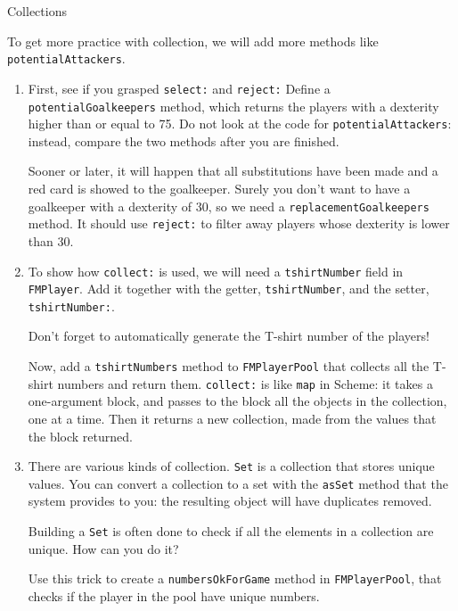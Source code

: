 \documentclass[a4paper,10pt]{scrartcl}
\begin{document}
\begin{exercise}{Collections}

To get more practice with collection, we will add more methods like
\verb!potentialAttackers!.

\begin{enumerate}
\item First, see if you grasped \verb!select:! and \verb!reject:!  Define
  a \verb!potentialGoalkeepers! method, which returns the players with a
  dexterity higher than or equal to 75.  Do not look at the code for
  \verb!potentialAttackers!: instead, compare the two methods after you are
  finished.

  Sooner or later, it will happen that all substitutions have been made and
  a red card is showed to the goalkeeper.  Surely you don't want to have a
  goalkeeper with a dexterity of 30, so we need a \verb!replacementGoalkeepers!
  method.  It should use \verb!reject:! to filter away players whose dexterity
  is lower than 30.

\item To show how \verb!collect:! is used, we will need a \verb!tshirtNumber!
  field in \verb!FMPlayer!.  Add it together with the getter,
  \verb!tshirtNumber!, and the setter, \verb!tshirtNumber:!.

  Don't forget to automatically generate the T-shirt number of the players!

  Now, add a \verb!tshirtNumbers! method to \verb!FMPlayerPool! that collects
  all the T-shirt numbers and return them.  \verb!collect:! is like
  \verb!map! in Scheme: it takes a one-argument block, and passes to the block
  all the objects in the collection, one at a time.  Then it returns a new
  collection, made from the values that the block returned.

\item There are various kinds of collection.  \verb!Set! is a collection
  that stores unique values.  You can convert a collection to a set with
  the \verb!asSet! method that the system provides to you: the resulting
  object will have duplicates removed.

  Building a \verb!Set! is often done to check if all the elements in a
  collection are unique.  How can you do it?


  Use this trick to create a \verb!numbersOkForGame! method in 
  \verb!FMPlayerPool!, that checks if the player in the pool have unique
  numbers.


\end{enumerate}
\end{exercise}
\end{document}
